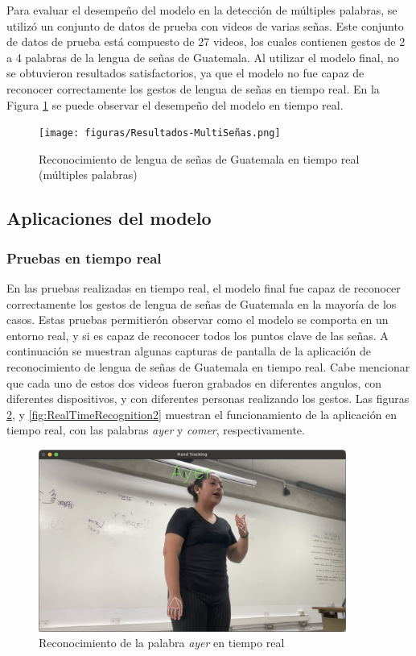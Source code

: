 Para evaluar el desempeño del modelo en la detección de múltiples palabras, se utilizó un conjunto de datos de prueba con videos de varias señas.
Este conjunto de datos de prueba está compuesto de 27 videos, los cuales contienen gestos de 2 a 4 palabras de la lengua de señas de Guatemala.
Al utilizar el modelo final, no se obtuvieron resultados satisfactorios, ya que el modelo no fue capaz de reconocer correctamente los gestos de lengua de señas en tiempo real.
En la Figura \ref{fig:RealTimeRecognition} se puede observar el desempeño del modelo en tiempo real.

\begin{figure}[H]
    \centering
    \texttt{[image: figuras/Resultados-MultiSeñas.png]}
    \caption{Reconocimiento de lengua de señas de Guatemala en tiempo real (múltiples palabras)}
    \label{fig:RealTimeRecognition}
\end{figure}

\subsection{Aplicaciones del modelo}

\subsubsection{Pruebas en tiempo real}

En las pruebas realizadas en tiempo real, el modelo final fue capaz de reconocer correctamente los gestos de lengua de señas de Guatemala en la mayoría de los casos.
Estas pruebas permitierón observar como el modelo se comporta en un entorno real, y si es capaz de reconocer todos los puntos clave de las señas.
A continuación se muestran algunas capturas de pantalla de la aplicación de reconocimiento de lengua de señas de Guatemala en tiempo real.
Cabe mencionar que cada uno de estos dos videos fueron grabados en diferentes angulos, con diferentes dispositivos, y con diferentes personas realizando los gestos.
Las figuras \ref{fig:RealTimeRecognition1}, y \ref{fig:RealTimeRecognition2} muestran el funcionamiento de la aplicación en tiempo real, con las palabras \textit{ayer} y \textit{comer}, respectivamente.

\begin{figure}[H]
    \centering
    \includegraphics[width=0.9\textwidth]{figuras/PruebaDemo1.jpeg}
    \caption{Reconocimiento de la palabra \textit{ayer} en tiempo real}
    \label{fig:RealTimeRecognition1}
\end{figure}

